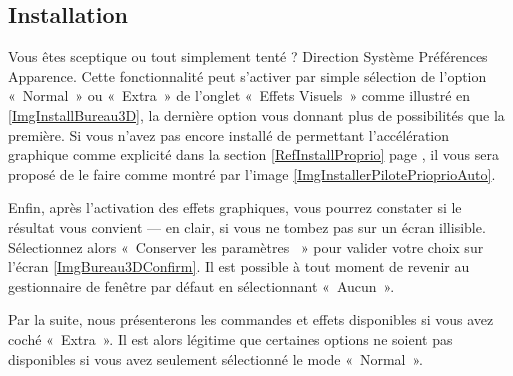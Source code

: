 \subsection{Installation}
Vous êtes sceptique ou tout simplement tenté ? Direction Système \FlecheDroite Préférences \FlecheDroite Apparence. Cette fonctionnalité peut s'activer par simple sélection de l'option «~Normal~» ou «~Extra~» de l'onglet «~Effets Visuels~» comme illustré en \ref{ImgInstallBureau3D}, la dernière option vous donnant plus de possibilités que la première. Si vous n'avez pas encore installé de  permettant l'accélération graphique comme explicité dans la section \ref{RefInstallProprio} page \pageref{RefInstallProprio}, il vous sera proposé de le faire comme montré par l'image \ref{ImgInstallerPilotePrioprioAuto}.\par
\InstallBureauTroisD
Enfin, après l'activation des effets graphiques, vous pourrez constater si le résultat vous convient --- en clair, si vous ne tombez pas sur un écran illisible. Sélectionnez alors «~Conserver les paramètres ~» pour valider votre choix sur l'écran \ref{ImgBureau3DConfirm}. Il est possible à tout moment de revenir au gestionnaire de fenêtre par défaut en sélectionnant «~Aucun~».
\begin{attention}
Par la suite, nous présenterons les commandes et effets disponibles si vous avez coché «~Extra~». Il est alors légitime que certaines options ne soient pas disponibles si vous avez seulement sélectionné le mode «~Normal~».
\end{attention}
